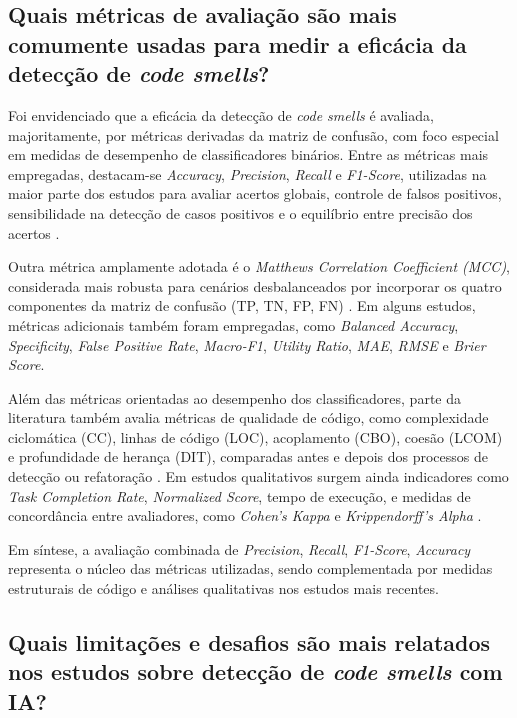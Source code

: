 {\subsection{Quais métricas de avaliação são mais comumente usadas para medir a eficácia da detecção de \textit{code smells}?}

Foi envidenciado que a eficácia da detecção de \textit{code smells} é 
avaliada, majoritamente, por métricas derivadas da matriz de confusão, com foco especial 
em medidas de desempenho de classificadores binários. Entre as métricas mais empregadas, 
destacam-se \textit{Accuracy}, \textit{Precision}, \textit{Recall} e \textit{F1-Score}, 
utilizadas na maior parte dos estudos para avaliar acertos globais, controle de falsos 
positivos, sensibilidade na detecção de casos positivos e o equilíbrio entre precisão dos acertos \cite{Yahya2024SQDS,Yadav2024Survey,Sahu2024Predicting}. 

Outra métrica amplamente adotada é o \textit{Matthews Correlation Coefficient (MCC)}, 
considerada mais robusta para cenários desbalanceados por incorporar os quatro componentes 
da matriz de confusão (TP, TN, FP, FN) \cite{Huang2024AligningXAI,Ho2023FusionCNNLSTM}. Em alguns estudos, métricas adicionais também foram 
empregadas, como \textit{Balanced Accuracy}, \textit{Specificity}, \textit{False Positive Rate}, 
\textit{Macro-F1}, \textit{Utility Ratio}, \textit{MAE}, \textit{RMSE} e \textit{Brier Score}.

Além das métricas orientadas ao desempenho dos classificadores, parte da literatura também 
avalia métricas de qualidade de código, como complexidade ciclomática (CC), linhas de código 
(LOC), acoplamento (CBO), coesão (LCOM) e profundidade de herança (DIT), comparadas antes 
e depois dos processos de detecção ou refatoração \cite{Haroon2025CodeInsight}. Em estudos qualitativos surgem ainda 
indicadores como \textit{Task Completion Rate}, \textit{Normalized Score}, tempo de execução, 
e medidas de concordância entre avaliadores, como \textit{Cohen's Kappa} e 
\textit{Krippendorff's Alpha} \cite{Huang2024DeveloperFeatures}.

Em síntese, a avaliação combinada de \textit{Precision}, \textit{Recall}, \textit{F1-Score}, 
\textit{Accuracy} representa o núcleo das métricas utilizadas, sendo complementada por medidas 
estruturais de código e análises qualitativas nos estudos mais recentes.


\subsection{Quais limitações e desafios são mais relatados nos estudos sobre detecção de \textit{code smells} com IA?}

}
